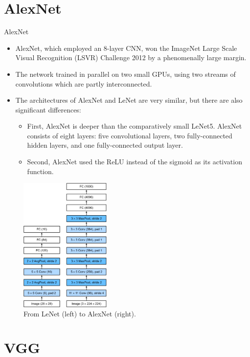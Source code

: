 \section{AlexNet}
\begin{vbframe}{AlexNet}
  \begin{itemize}
    \item AlexNet, which employed an 8-layer CNN, won the ImageNet Large Scale Visual Recognition (LSVR) Challenge 2012 by a phenomenally large margin.
    \item The network trained in parallel on two small GPUs, using two streams of convolutions which are partly interconnected.
    \item The architectures of AlexNet and LeNet are very similar, but there are also significant differences: 
       \begin{itemize}
          \item First, AlexNet is deeper than the comparatively small LeNet5. AlexNet consists of eight layers: five convolutional layers, two fully-connected hidden layers, and one fully-connected output layer. 
          \item Second, AlexNet used the ReLU instead of the sigmoid as its activation function. 
       \end{itemize}
  \end{itemize}
    \begin{figure}
        \centering
        \includegraphics[width=4.5cm]{plots/moderncnn/alexnet.png}
        \caption{From LeNet (left) to AlexNet (right).}
    \end{figure}
\end{vbframe}


\section{VGG}

